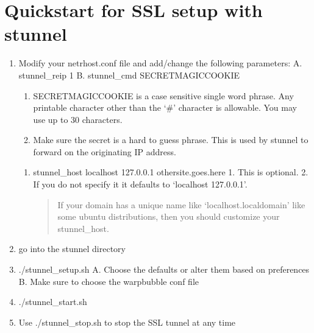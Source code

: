 \documentclass[letterpaper,10pt,english]{sphinxmanual}
\begin{document}
\section{Quickstart for SSL setup with stunnel}
\label{\detokenize{14-ssl:quickstart-for-ssl-setup-with-stunnel}}\begin{enumerate}
%
\item {} 
\sphinxAtStartPar
Modify your netrhost.conf file and add/change the following parameters:
A. stunnel\_reip 1
B. stunnel\_cmd SECRET\sphinxhyphen{}MAGIC\sphinxhyphen{}COOKIE
\begin{enumerate}
%
\item {} 
\sphinxAtStartPar
SECRET\sphinxhyphen{}MAGIC\sphinxhyphen{}COOKIE is a case sensitive single word phrase.  Any
printable character other than the ‘\#’ character is allowable.
You may use up to 30 characters.

\item {} 
\sphinxAtStartPar
Make sure the secret is a hard to guess phrase.  This is used
by stunnel to forward on the originating IP address.

\end{enumerate}
\begin{enumerate}
%
\setcounter{enumii}{2}
\item {} 
\sphinxAtStartPar
stunnel\_host localhost 127.0.0.1 othersite.goes.here
1.  This is optional.
2.  If you do not specify it it defaults to ‘localhost 127.0.0.1’.
\begin{quote}

\sphinxAtStartPar
If your domain has a unique name like ‘localhost.localdomain’
like some ubuntu distributions, then you should customize your
stunnel\_host.
\end{quote}

\end{enumerate}

\item {} 
\sphinxAtStartPar
go into the stunnel directory

\item {} 
\sphinxAtStartPar
./stunnel\_setup.sh
A. Choose the defaults or alter them based on preferences
B. Make sure to choose the warpbubble conf file

\item {} 
\sphinxAtStartPar
./stunnel\_start.sh

\item {} 
\sphinxAtStartPar
Use ./stunnel\_stop.sh to stop the SSL tunnel at any time

\end{enumerate}
\end{document}
